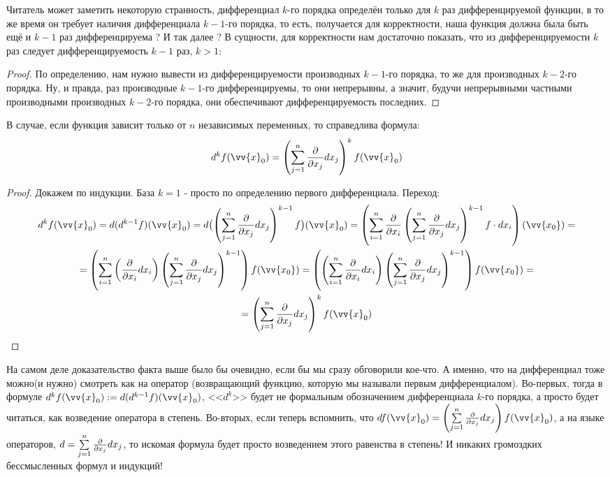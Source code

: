 \begin{definition}
	\begin{anote}
		Читатель может заметить некоторую странность, дифференциал $k$-го порядка определён только для $k$ раз дифференцируемой функции, в то же время он требует наличия дифференциала $k-1$-го порядка, то есть, получается для корректности, наша функция должна была быть ещё и $k-1$ раз дифференцируема ? И так далее ? В сущности, для корректности нам достаточно показать, что из дифференцируемости $k$ раз следует дифференцируемость $k-1$ раз, $k>1$:
		\begin{proof}
			По определению, нам нужно вывести из дифференцируемости производных $k-1$-го порядка, то же для производных $k-2$-го порядка. Ну, и правда, раз производные $k-1$-го дифференцируемы, то они непрерывны, а значит, будучи непрерывными частными производными производных $k-2$-го порядка, они обеспечивают дифференцируемость последних.
		\end{proof}
	\end{anote}
	В случае, если функция зависит только от $n$ независимых переменных, то справедлива формула:
	\[
		d^k f(\vv{x}_0) = \left(\suml_{j = 1}^n \pd{}{x_j} dx_j\right)^k f(\vv{x}_0)
	\]
	\begin{proof}
		Докажем по индукции. База $k=1$ - просто по определению первого дифференциала. Переход:
		\begin{multline*}
			d^k f(\vv{x}_0)
			= 
			d(d^{k - 1} f)(\vv{x}_0) 
			= 
			d\bigl(\left(\suml_{j = 1}^n \pd{}{x_j} dx_j\right)^{k-1}f\bigr) (\vv{x}_0) 
			= 
			\left( \suml_{i = 1}^n \pd{}{x_i} \left(\suml_{j = 1}^n \pd{}{x_j} dx_j\right)^{k-1}f\cdot dx_i \right) (\vv{x_0})  
			=
			\\
			=\left(\suml_{i = 1}^n \left(\pd{}{x_i}dx_i\right) \left(\suml_{j = 1}^n \pd{}{x_j} dx_j\right)^{k-1}\right)f(\vv{x_0}) 
			=
			\left(\left(\suml_{i = 1}^n \pd{}{x_i}dx_i\right) \left(\suml_{j = 1}^n \pd{}{x_j} dx_j\right)^{k-1}\right)f(\vv{x_0}) 
			=
			\\
			=
			\left(\suml_{j = 1}^n \pd{}{x_j} dx_j\right)^k f(\vv{x}_0) 
		\end{multline*}
	\end{proof}
\end{definition}

\begin{anote}
	На самом деле доказательство факта выше было бы очевидно, если бы мы сразу обговорили кое-что. А именно, что на дифференциал тоже можно(и нужно) смотреть как на оператор (возвращающий функцию, которую мы называли первым дифференциалом). Во-первых, тогда в формуле $d^k f(\vv{x}_0) := d(d^{k - 1} f)(\vv{x}_0)$, <<$d^k$>> будет не формальным обозначением дифференциала $k$-го порядка, а просто будет читаться, как возведение оператора в степень. Во-вторых, если теперь вспомнить, что $d f(\vv{x}_0) = \left(\suml_{j = 1}^n \pd{}{x_j} dx_j\right) f(\vv{x}_0)$, а на языке операторов, $d = \sum\limits_{j = 1}^n \frac{\partial }{\partial x_j} dx_j$, то искомая формула будет просто возведением этого равенства в степень! И никаких громоздких бессмысленных формул и индукций!  
\end{anote}

